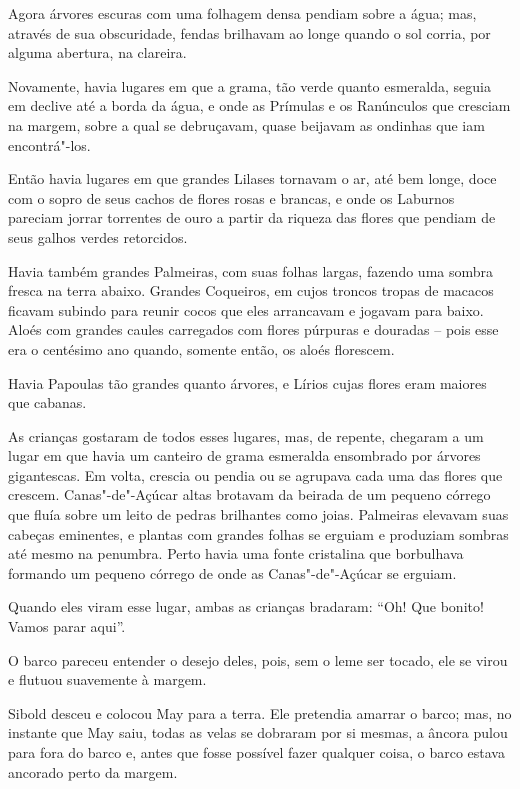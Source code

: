 Agora árvores escuras com uma folhagem densa pendiam sobre a água; mas,
através de sua obscuridade, fendas brilhavam ao longe quando o sol
corria, por alguma abertura, na clareira.

Novamente, havia lugares em que a grama, tão verde quanto esmeralda,
seguia em declive até a borda da água, e onde as Prímulas e os
Ranúnculos que cresciam na margem, sobre a qual se debruçavam, quase
beijavam as ondinhas que iam encontrá"-los.

Então havia lugares em que grandes Lilases tornavam o ar, até bem longe,
doce com o sopro de seus cachos de flores rosas e brancas, e onde os
Laburnos pareciam jorrar torrentes de ouro a partir da riqueza das
flores que pendiam de seus galhos verdes retorcidos.

Havia também grandes Palmeiras, com suas folhas largas, fazendo uma
sombra fresca na terra abaixo. Grandes Coqueiros, em cujos troncos
tropas de macacos ficavam subindo para reunir cocos que eles arrancavam
e jogavam para baixo. Aloés com grandes caules carregados com flores
púrpuras e douradas -- pois esse era o centésimo ano quando, somente
então, os aloés florescem.

Havia Papoulas tão grandes quanto árvores, e Lírios cujas flores eram
maiores que cabanas.

As crianças gostaram de todos esses lugares, mas, de repente, chegaram a
um lugar em que havia um canteiro de grama esmeralda ensombrado por
árvores gigantescas. Em volta, crescia ou pendia ou se agrupava cada uma
das flores que crescem. Canas"-de"-Açúcar altas brotavam da beirada de um
pequeno córrego que fluía sobre um leito de pedras brilhantes como
joias. Palmeiras elevavam suas cabeças eminentes, e plantas com grandes
folhas se erguiam e produziam sombras até mesmo na penumbra. Perto havia
uma fonte cristalina que borbulhava formando um pequeno córrego de onde
as Canas"-de"-Açúcar se erguiam.

Quando eles viram esse lugar, ambas as crianças bradaram: ``Oh! Que
bonito! Vamos parar aqui''.

O barco pareceu entender o desejo deles, pois, sem o leme ser tocado,
ele se virou e flutuou suavemente à margem.

Sibold desceu e colocou May para a terra. Ele pretendia amarrar o barco;
mas, no instante que May saiu, todas as velas se dobraram por si mesmas,
a âncora pulou para fora do barco e, antes que fosse possível fazer
qualquer coisa, o barco estava ancorado perto da margem.

